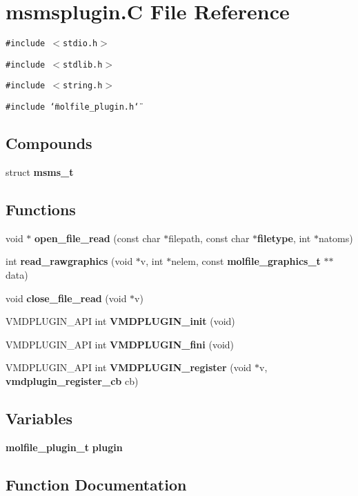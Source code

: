 \section{msmsplugin.C File Reference}
\label{msmsplugin_8C}
{\tt \#include $<$stdio.h$>$}\par
{\tt \#include $<$stdlib.h$>$}\par
{\tt \#include $<$string.h$>$}\par
{\tt \#include \char`\"{}molfile\_\-plugin.h\char`\"{}}\par
\subsection*{Compounds}
\begin{CompactItemize}
\item 
struct {\bf msms\_\-t}
\end{CompactItemize}
\subsection*{Functions}
\begin{CompactItemize}
\item 
void $\ast$ {\bf open\_\-file\_\-read} (const char $\ast$filepath, const char $\ast${\bf filetype}, int $\ast$natoms)
\item 
int {\bf read\_\-rawgraphics} (void $\ast$v, int $\ast$nelem, const {\bf molfile\_\-graphics\_\-t} $\ast$$\ast$data)
\item 
void {\bf close\_\-file\_\-read} (void $\ast$v)
\item 
VMDPLUGIN\_\-API int {\bf VMDPLUGIN\_\-init} (void)
\item 
VMDPLUGIN\_\-API int {\bf VMDPLUGIN\_\-fini} (void)
\item 
VMDPLUGIN\_\-API int {\bf VMDPLUGIN\_\-register} (void $\ast$v, {\bf vmdplugin\_\-register\_\-cb} cb)
\end{CompactItemize}
\subsection*{Variables}
\begin{CompactItemize}
\item 
{\bf molfile\_\-plugin\_\-t} {\bf plugin}
\end{CompactItemize}


\subsection{Function Documentation}
